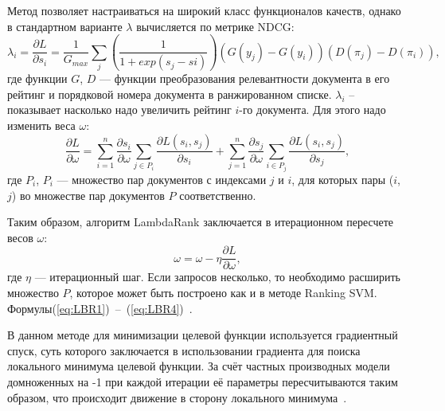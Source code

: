 Метод позволяет настраиваться на широкий класс функционалов качеств, однако в стандартном варианте $\lambda$ вычисляется по метрике NDCG:
\begin{equation}
	\label{eq:LBR2}
	\lambda_{i} = \frac{\partial L}{\partial s_{i}} = \frac{1}{G_{max}} \sum_{j}(\frac{1}{1 + exp(s_{j} - s{i})})(G(y_{j}) - G(y_{i}))(D(\pi_{j}) - D(\pi_{i})),
\end{equation}
где функции $G$, $D$ ---  функции преобразования релевантности документа в его рейтинг и порядковой номера документа в ранжированном списке.  $\lambda_{i}$ – показывает насколько надо увеличить рейтинг $i$-го документа. Для этого надо изменить веса $\omega$:
\begin{equation}
	\label{eq:LBR3}
	\frac{\partial L}{\partial \omega} = \sum_{i=1}^{n}\frac{\partial s_{i}}{\partial \omega}\sum_{j \in P_{i}}\frac{\partial L(s_{i}, s_{j})}{\partial s_{i}} + \sum_{j=1}^{n}\frac{\partial s_{j}}{\partial \omega}\sum_{i \in P_{j}}\frac{\partial L(s_{i}, s_{j})}{\partial s_{j}},
\end{equation}
где $P_{i}$, $P_{i}$ --- множество пар документов с индексами $j$ и $i$, для которых пары ($i$, $j$) во множестве пар документов $P$ соответственно.

Таким образом, алгоритм LambdaRank заключается в итерационном пересчете весов $\omega$:
\begin{equation}
	\label{eq:LBR4}
	\omega = \omega - \eta\frac{\partial L}{\partial \omega},
\end{equation}
где $\eta$ --- итерационный шаг. Если запросов несколько, то необходимо расширить множество $P$, которое может быть построено как и в методе Ranking SVM. Формулы(\ref{eq:LBR1})~--~(\ref{eq:LBR4})~\cite{LamdaRank}.

В данном методе для минимизации целевой функции используется градиентный спуск, суть которого заключается в использовании градиента для поиска локального минимума целевой функции. За счёт частных производных модели домноженных на -1 при каждой итерации её параметры пересчитываются таким образом, что происходит движение в сторону локального минимума~\cite{ML_no_wors}.

